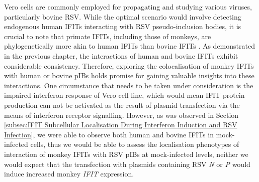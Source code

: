 Vero cells are commonly employed for propagating and studying various viruses, particularly bovine RSV. While the optimal scenario would involve detecting endogenous human IFITs interacting with RSV pseudo-inclusion bodies, it is crucial to note that primate IFITs, including those of monkeys, are phylogenetically more akin to human IFITs than bovine IFITs \cite{Zhou2013InterferonDefense.}. As demonstrated in the previous chapter, the interactions of human and bovine IFITs exhibit considerable consistency. Therefore, exploring the colocalisation of monkey IFITs with human or bovine pIBs holds promise for gaining valuable insights into these interactions. One circumstance that needs to be taken under consideration is the impaired interferon response of Vero cell line, which would mean IFIT protein production can not be activated as the result of plasmid transfection via the means of interferon receptor signalling. However, as was observed in Section \ref{subsec:IFIT Subcellular Localisation During Interferon Induction and RSV Infection}, we were able to observe both human and bovine IFITs in mock-infected cells, thus we would be able to assess the localisation phenotypes of interaction of monkey IFITs with RSV pIBs at mock-infected levels, neither we would expect that the transfection with plasmids containing RSV \textit{N} or \textit{P} would induce increased monkey \textit{IFIT} expression.

